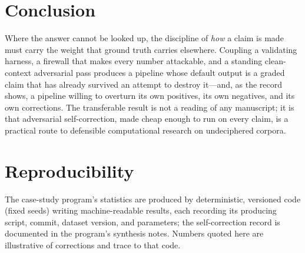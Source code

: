 \documentclass[11pt]{article}
\begin{document}
\section{Conclusion}
Where the answer cannot be looked up, the discipline of \emph{how} a claim is made must carry
the weight that ground truth carries elsewhere. Coupling a validating harness, a firewall that
makes every number attackable, and a standing clean-context adversarial pass produces a
pipeline whose default output is a graded claim that has already survived an attempt to
destroy it---and, as the record shows, a pipeline willing to overturn its own positives, its
own negatives, and its own corrections. The transferable result is not a reading of any
manuscript; it is that adversarial self-correction, made cheap enough to run on every claim,
is a practical route to defensible computational research on undeciphered corpora.

\section*{Reproducibility}
The case-study program's statistics are produced by deterministic, versioned code (fixed
seeds) writing machine-readable results, each recording its producing script, commit,
dataset version, and parameters; the self-correction record is documented in the program's
synthesis notes. Numbers quoted here are illustrative of corrections and trace to that code.



\end{document}
